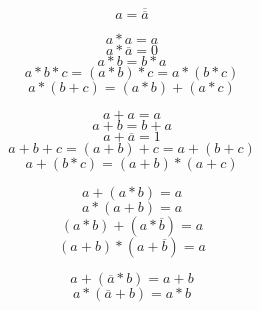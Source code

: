 \documentclass{article}
\begin{document}
\begin{answer}[]
    \begin{equation*}
        a=\overline{\overline{a}}
    \end{equation*}

    \begin{equation*}
        a*a = a 
    \end{equation*}
    \begin{equation*}
        a*\overline{a} = 0 
    \end{equation*}
    \begin{equation*}
        a*b = b*a 
    \end{equation*}
    \begin{equation*}
        a*b*c = (a*b)*c = a*(b*c) 
    \end{equation*}
    \begin{equation*}
    a * (b + c) =   (a * b) + (a * c)
    \end{equation*}


    \begin{equation*}
        a+a = a 
    \end{equation*}
    \begin{equation*}
        a+b = b+a 
    \end{equation*}
    \begin{equation*}
        a+\overline{a} = 1 
    \end{equation*}
    \begin{equation*}
        a+b+c = (a+b)+c = a+(b+c) 
    \end{equation*}
    \begin{equation*}
        a + (b * c) =   (a + b) * (a + c)
    \end{equation*}


    \begin{equation*}
        a + ( a * b) = a
    \end{equation*}
    \begin{equation*}
        a * ( a + b) = a
    \end{equation*}
    \begin{equation*}
        (a * b) + ( a * \overline{b}) = a
    \end{equation*}
    \begin{equation*}
        (a + b) * (a + \overline{b}) = a
    \end{equation*}

    \begin{equation*}
        a + (\overline{a} * b) = a + b
     \end{equation*}
     \begin{equation*}
        a * (\overline{a} + b) = a * b
     \end{equation*}
     
    
\end{answer}
\end{document}
